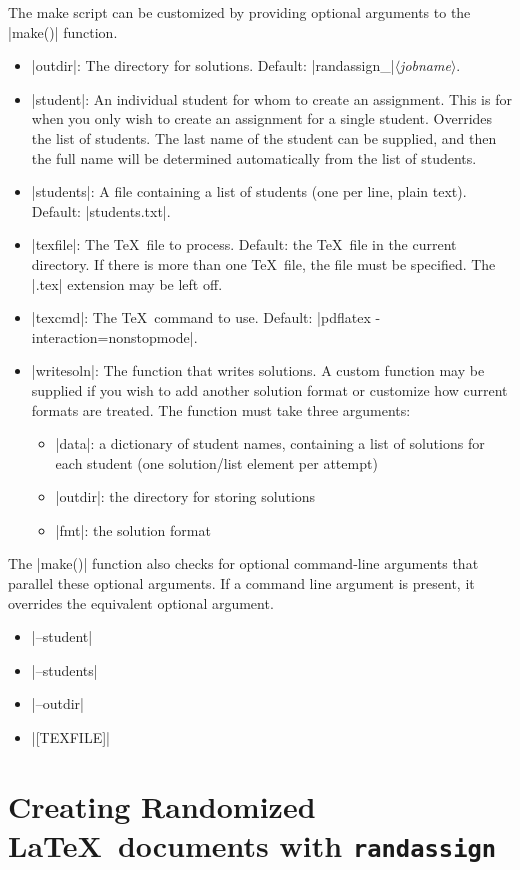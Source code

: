 \documentclass[11pt]{article}
\newcommand{\ra}{\texttt{randassign}}
\begin{document}
The make script can be customized by providing optional arguments to the |make()| function.
\begin{itemize}
\item |outdir|:  The directory for solutions.  Default:  |randassign_|$\langle$\textit{jobname}$\rangle$.
\item |student|:  An individual student for whom to create an assignment.  This is for when you only wish to create an assignment for a single student.  Overrides the list of students.  The last name of the student can be supplied, and then the full name will be determined automatically from the list of students.
\item |students|:  A file containing a list of students (one per line, plain text).  Default:  |students.txt|.
\item |texfile|:  The \TeX\ file to process.  Default:  the \TeX\ file in the current directory.  If there is more than one \TeX\ file, the file must be specified.  The |.tex| extension may be left off.
\item |texcmd|:  The \TeX\ command to use.  Default:  |pdflatex -interaction=nonstopmode|.
\item |writesoln|:  The function that writes solutions.  A custom function may be supplied if you wish to add another solution format or customize how current formats are treated.  The function must take three arguments:
    \begin{itemize}
    \item |data|:  a dictionary of student names, containing a list of solutions for each student (one solution/list element per attempt)
    \item |outdir|:  the directory for storing solutions
    \item |fmt|:  the solution format
    \end{itemize}
\end{itemize}

The |make()| function also checks for optional command-line arguments that parallel these optional arguments.  If a command line argument is present, it overrides the equivalent optional argument.
\begin{itemize}
\item |--student|
\item |--students|
\item |--outdir|
\item |[TEXFILE]|
\end{itemize}


\section{Creating Randomized \LaTeX\ documents with \ra}
\end{document}
